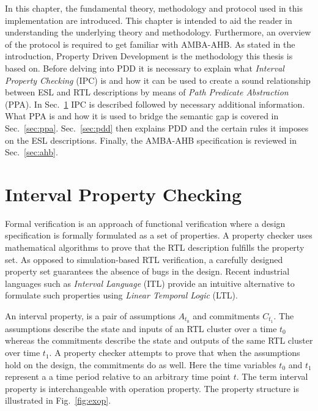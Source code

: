 \label{ch:theory}

In this chapter, the fundamental theory, methodology and protocol used in this implementation are introduced. This chapter is intended to aid the reader in understanding the underlying theory and methodology. Furthermore, an overview of the protocol is required to get familiar with AMBA-AHB. As stated in the introduction, Property Driven Development is the methodology this thesis is based on. Before delving into PDD it is necessary to explain what \textit{Interval Property Checking} (IPC) is and how it can be used to create a sound relationship between ESL and RTL descriptions by means of \textit{Path Predicate Abstraction} (PPA). In Sec.~\ref{sec:ipc} IPC is described followed by necessary additional information. What PPA is and how it is used to bridge the semantic gap is covered in Sec.~\ref{sec:ppa}. Sec.~\ref{sec:pdd} then explains PDD and the certain rules it imposes on the ESL descriptions. Finally, the AMBA-AHB specification is reviewed in Sec.~\ref{sec:ahb}.       


\section{Interval Property Checking}
\label{sec:ipc}
Formal verification is an approach of functional verification where a design specification is formally formulated as a set of properties. A property checker uses mathematical algorithms to prove that the RTL description fulfills the property set. As opposed to simulation-based RTL verification, a carefully designed property set guarantees the absence of bugs in the design. Recent industrial languages such as \textit{Interval Language} (ITL) provide an intuitive alternative to formulate such properties using \textit{Linear Temporal Logic} (LTL). \par
An interval property, is a pair of assumptions $A_{t_0}$ and commitments $C_{t_1}$. The assumptions describe the state and inputs of an RTL cluster over a time $t_0$ whereas the commitments describe the state and outputs of the same RTL cluster over time $t_1$. A property checker attempts to prove that when the assumptions hold on the design, the commitments do as well. Here the time variables $t_0$ and $t_1$ represent a a time period relative to an arbitrary time point $t$. The term interval property is interchangeable with operation property. The property structure is illustrated in Fig.~\ref{fig:exop}.  

